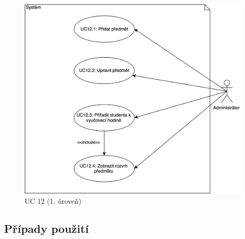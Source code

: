 \documentclass[a4paper,10pt,titlepage]{article}
\begin{document}
		\begin{figure}[h!]
			\centering
					\includegraphics[width=\textwidth]{vis_use_case_diagram_12}
			\caption{UC 12 (1. úroveň)}
		\end{figure}
		
	\subsection{Případy použití}
\end{document}
